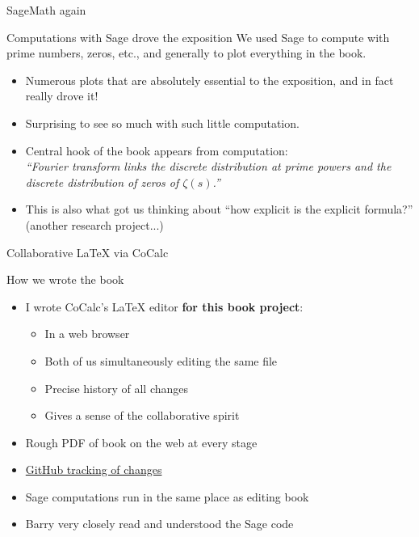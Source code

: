 \documentclass{beamer}
\begin{document}
\begin{frame}{SageMath again}
  \begin{block}{Computations with Sage drove the exposition}
    We used Sage to compute with prime numbers, zeros, etc., and generally to plot everything in the book.
    \begin{itemize}
      \item Numerous plots that are absolutely essential to the exposition, and in fact really drove it!
      \item Surprising to see so much with such little computation.
      \item Central hook of the book appears from computation:\\
            {\em ``Fourier transform links the discrete distribution at prime powers and the discrete distribution of zeros of $\zeta(s)$.''}
      \item This is also what got us thinking about ``how explicit is the explicit formula?'' (another research project...)
    \end{itemize}
  \end{block}
\end{frame}


\begin{frame}{Collaborative \LaTeX{} via CoCalc}
  \begin{block}{How we wrote the book}
    \begin{itemize}
      \item I wrote  CoCalc's \LaTeX{} editor {\bf for this book project}:
            \begin{itemize}
              \item In a web browser
              \item Both of us simultaneously editing the same file
              \item Precise history of all changes
              \item Gives a sense of the collaborative spirit
            \end{itemize}
      \item Rough PDF of book on the web at every stage
      \item \href{https://github.com/williamstein/rh}{GitHub tracking of changes}
      \item Sage computations run in the same place as editing book
      \item Barry very closely read and understood the Sage code
    \end{itemize}
  \end{block}
\end{frame}
\end{document}

